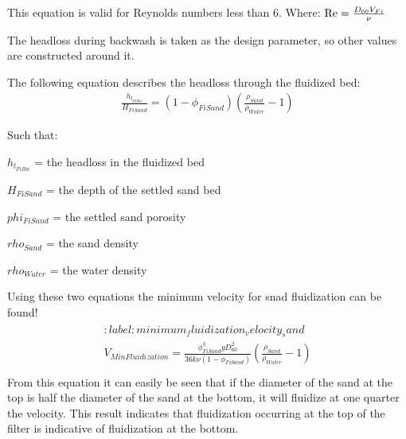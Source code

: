\documentclass[letterpaper,10pt,english]{sphinxmanual}
\begin{document}
This equation is valid for Reynolds numbers less than 6. Where:
\({\rm Re}  = \frac{D_{60} V_{Fi}}{\nu}\)

The headloss during backwash is taken as the design parameter, so other values are constructed around it.

The following equation describes the headloss through the fluidized bed:
\begin{equation}\label{equation:Filtration/Filtration_Design:headloss_fluidzed_bed}
\begin{split} \frac{h_{l_{FiBw}}}{H_{FiSand}} = \left( 1 - \phi_{FiSand} \right)\left( \frac{\rho_{Sand}}{\rho_{Water}} - 1 \right)\end{split}
\end{equation}
\begin{DUlineblock}{0em}
\item[] Such that:
\item[] \(h_{l_{FiBw}}\) = the headloss in the fluidized bed
\item[] \(H_{FiSand}\) =  the depth of the settled sand bed
\item[] \(phi_{FiSand}\) = the settled sand porosity
\item[] \(rho_{Sand}\)  = the sand density
\item[] \(rho_{Water}\) = the water density
\end{DUlineblock}

Using these two equations the minimum velocity for snad fluidization can be found!
\begin{align}\label{equation:Filtration/Filtration_Design:Filtration/Filtration_Design:1}\!\begin{aligned}
:label: minimum_fluidization_velocity_sand\\
V_{MinFluidization} = \frac{\phi_{FiSand}^3 g D_{60}^2}{36 k \nu \left( 1 - \phi_{FiSand} \right)} \left( \frac{\rho_{Sand}}{\rho_{Water}} - 1 \right)\\
\end{aligned}\end{align}
From this equation it can easily be seen that if the diameter of the sand at the top is half the diameter of the sand at the bottom, it will fluidize at one quarter the velocity. This result indicates that fluidization occurring at the top of the filter is  indicative of fluidization at the bottom.
\end{document}
